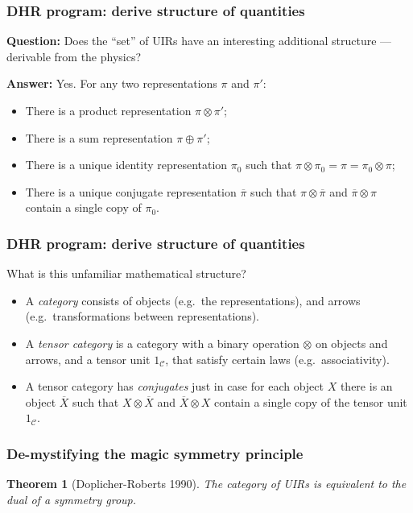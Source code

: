 \documentclass{beamer}
\def\ol{\overline}
\newtheorem{thm}{Theorem}
\begin{document}
\begin{frame}
  \frametitle{DHR program: derive structure of quantities}

  \textbf{Question:} Does the ``set'' of UIRs have an interesting
  additional structure --- derivable from the physics? \pause

\bigskip 
\textbf{Answer:} Yes.  For any two representations $\pi$ and $\pi '$:
\begin{itemize}
\item There is a product representation $\pi\otimes \pi '$;
\item There is a sum representation $\pi \oplus \pi '$;
\item There is a unique identity representation $\pi _0$ such that
  $\pi \otimes \pi _0 = \pi =\pi _0\otimes \pi$;
\item There is a unique conjugate representation $\ol\pi$ such that
  $\pi\otimes \ol\pi$ and $\ol\pi\otimes\pi$ contain a single copy of
  $\pi _0$.
\end{itemize}

\end{frame}


\begin{frame}\frametitle{DHR program: derive structure of quantities}

  What is this unfamiliar mathematical structure? \pause

\bigskip
\begin{itemize}
\item A \emph{category} consists of objects (e.g.\ the
  representations), and arrows (e.g.\ transformations between
  representations). \pause
\item A \emph{tensor category} is a category with a binary operation
  $\otimes$ on objects and arrows, and a tensor unit
  $1_{\mathcal{C}}$, that satisfy certain laws (e.g.\ associativity). \pause
\item A tensor category has \emph{conjugates} just in case for each
  object $X$ there is an object $\ol X$ such that $X\otimes \ol X$ and
  $\ol X\otimes X$ contain a single copy of the tensor unit
  $1_{\mathcal{C}}$.
\end{itemize}
\end{frame}


\begin{frame}\frametitle{De-mystifying the magic symmetry principle}
\begin{thm}[Doplicher-Roberts 1990] The category of UIRs is equivalent to
  the dual of a symmetry group.  
\end{thm}

\end{frame}
\end{document}
